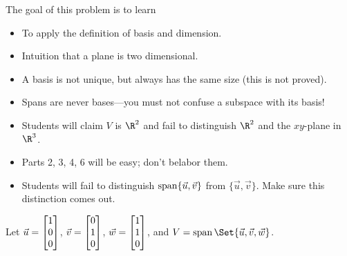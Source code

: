 	\question
	\begin{annotation}
		\begin{goals}

			The goal of this problem is to learn
			\begin{itemize}
				\item To apply the definition of basis and dimension.
				\item Intuition that a plane is two dimensional.
				\item A basis is not unique, but always has the same size (this is not proved).
				\item Spans are never bases---you must not confuse a subspace with its basis!
			\end{itemize}
		\end{goals}

		\begin{notes}
			\begin{itemize}
				\item Students will claim $V$ is $\R^2$ and fail to distinguish
					$\R^2$ and the $xy$-plane in $\R^3$.
				\item Parts 2, 3, 4, 6 will be easy; don't belabor them.
				\item Students will fail to distinguish $\operatorname{span}\{\vec u,\vec v\}$
					from $\{\vec u,\vec v\}$. Make sure this distinction comes out.
			\end{itemize}
		\end{notes}
	\end{annotation}
	Let $\vec u=\mat{1\\0\\0}$, $\vec v=\mat{0\\1\\0}$, $\vec w=\mat{1\\1\\0}$,
	and $V=\Span\Set{\vec u,\vec v,\vec w}$.
